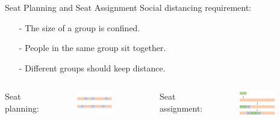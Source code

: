     \begin{frame}{Seat Planning and Seat Assignment}
      Social distancing requirement: 
      
      \begin{itemize}
        \item[-] The {\color{red}size} of a group is confined.
        \item[-] People in the same group {\color{red} sit together}.
        \item[-] Different groups should keep distance.
      \end{itemize}
      
      \vspace{0.5cm}

      \begin{columns}
        \column{5cm}  %
        Seat planning: 
          \begin{figure}[ht]
            \centering
            \includegraphics[width = 0.8\textwidth]{./images/seat_planning1.png}
          \end{figure}
          \column{5cm}
        Seat assignment:
          \scriptsize
          \begin{figure}[ht]
            \centering
            \includegraphics[width = 0.8\textwidth]{./images/seat_assignment1.png}
          \end{figure}
      \end{columns}
    \end{frame}
    


